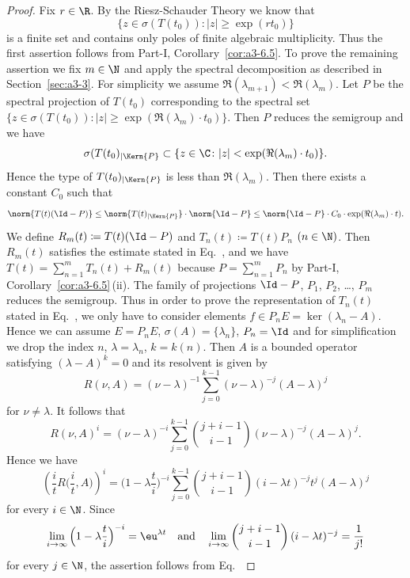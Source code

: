 \begin{proof}
	Fix $r \in \R$.
	By the Riesz-Schauder Theory we know that
	\[
    \{z \in \sigma(T(t_{0})) \colon |z| \geq \exp(rt_{0})\}
    \]
    is a finite set and contains only
	poles of finite algebraic multiplicity.
	Thus the first assertion
	follows from Part-I, Corollary~\ref{cor:a3-6.5}.
	To prove the remaining assertion we fix $m \in \N$ and apply the spectral
	decomposition as described in Section~\ref{sec:a3-3}.
	For simplicity we assume $\Re(\lambda_{m+1}) < \Re(\lambda_m)$.
	Let $P$ be the spectral projection
	of\/ $T(t_{0})$ corresponding to the spectral set $\{z \in \sigma(T(t_{0})) :
	|z| \geq \exp(\Re(\lambda_m) \cdot t_{0})\}$.
	Then $P$ reduces the semigroup and we have
	\[
	\sigma(T(t_{0})_{\vert \Kern{P}} \subset \{z \in \C \colon |z| < \exp(\Re(\lambda_m) \cdot t_{0})\} .
\]
%
	Hence the type of
	$T(t_{0})_{\vert \Kern{P}} $ is less than $\Re(\lambda_m)$.
	Then there exists a constant $C_{0}$ such that
\[
\norm{T(t)(\Id -P)} \leq \norm{T(t)_{\vert \Kern{P}}}\cdot\norm{\Id -P} \leq \norm{\Id -P}\cdot C_{0} \cdot \exp(\Re(\lambda_m) \cdot t) .
\]
We define $R_m(t)  \coloneq  T(t)(\Id -P)$ and $T_n(t)  \coloneq  T(t)P_n$ $(n \in \N)$.
Then $R_m(t)$ satisfies the estimate stated in Eq.~, and we have $T(t) =
\sum_{n=1}^m T_n(t) + R_m(t)$ because $P = \sum_{n=1}^m P_n$ by Part-I, Corollary~\ref{cor:a3-6.5}\,(ii).
The family of projections $\Id -P$, $P_1$, $P_2$, \ldots , $P_m$ reduces the semigroup.
Thus in order to prove the representation of\/ $T_n(t)$ stated in
Eq.~, we only have to consider elements $f \in P_n E = \ker(\lambda_n-A)$.
Hence we can assume $E = P_n E$, $\sigma(A) = \{\lambda_n\}$, $P_n = \Id $ and for simplification
we drop the index $n$, \ie  $\lambda = \lambda_n$, $k = k(n)$.
Then $A$ is a bounded operator satisfying $(\lambda - A)^k = 0$ and its resolvent is given by
%
\[
	R(\nu,A) = (\nu-\lambda)^{-1}\sum_{j=0}^{k-1}(\nu-\lambda)^{-j}(A-\lambda)^j
\]
%
for $\nu \neq \lambda$.
It follows that
%
\[
	 R(\nu,A)^i = (\nu-\lambda)^{-i}\sum_{j=0}^{k-1}\binom{j+i-1}{i-1}(\nu-\lambda)^{-j}(A-\lambda)^j .
\]
Hence we have
\[
\left(\frac{i}{t}R\Big(\frac{i}{t},A\Big)\right)^i = \Big(1-\lambda\frac{t}{i}\Big)^{-i}\sum_{j=0}^{k-1}\binom{j+i-1}{i-1}(i-\lambda t)^{-j}t^j(A-\lambda)^j 
\]
for every $i \in \N$.
Since 
%
\[
\lim_{i\to\infty}\Big(1-\lambda\frac{t}{i}\Big)^{-i} = \eu^{\lambda t}
\quad \text{and} \quad \lim_{i\to\infty}\binom{j+i-1}{i-1}\,(i-\lambda t)^{-j} = \frac{1}{j!}
\]
%
for every $j \in \N$, the assertion follows from Eq.~
\end{proof}
